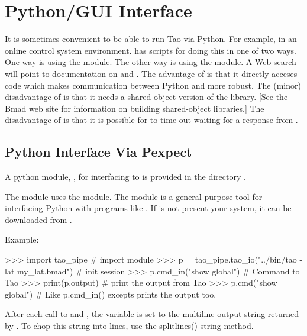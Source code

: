 \chapter{Python/GUI Interface}
\label{c:python}

It is sometimes convenient to be able to run Tao via Python. For example, in an online control
system environment. \tao has scripts for doing this in one of two ways. One way is using the
 module. The other way is using the  module. A Web search will point to
documentation on  and . The advantage of  is that it directly
acceses \tao code which makes communication between Python and \tao more robust. The (minor)
disadvantage of  is that it needs a shared-object version of the  library. [See
the Bmad web site for information on building shared-object libraries.] The disadvantage of
 is that it is possible for  to time out waiting for a response from \tao.

\section{Python Interface Via Pexpect}

A python module, , for interfacing \tao to 
is provided in the directory .

The  module uses the  module. The
 module is a general purpose tool for interfacing
Python with programs like \tao. If  is not present
your system, it can be downloaded from
. 

Example:
\begin{example}
  >>> import tao_pipe                                       # import module
  >>> p = tao_pipe.tao_io("../bin/tao -lat my_lat.bmad")    # init session
  >>> p.cmd_in("show global")               # Command to Tao
  >>> print(p.output)                       # print the output from Tao
  >>> p.cmd("show global")                  # Like p.cmd_in() excepts prints the output too.
\end{example}

After each call to  and , the
 variable is set to the multiline output string
returned by \tao. To chop this string into lines, use the splitlines()
string method.


